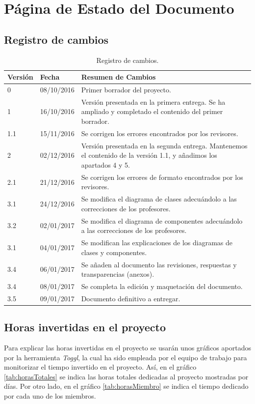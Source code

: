 \section*{Página de Estado del Documento}

\subsection*{Registro de cambios}
\begin{table}[htbp]
\begin{center}
\begin{tabular}{l l p{11cm} }
\textbf{Versión}&\textbf{Fecha}&\textbf{Resumen de Cambios}\\
\hline \hline
0&08/10/2016&Primer borrador del proyecto.\\
\hline
1&16/10/2016&Versión presentada en la primera entrega. Se ha ampliado y completado el contenido del primer
borrador.\\
\hline
1.1&15/11/2016&Se corrigen los errores encontrados por los revisores.\\
\hline
2&02/12/2016&Versión presentada en la segunda entrega. Mantenemos el contenido de la versión 1.1, y
añadimos los apartados 4 y 5.\\
\hline
2.1&21/12/2016&Se corrigen los errores de formato encontrados por los revisores.\\
\hline
3.1&24/12/2016&Se modifica el diagrama de clases\index{clase} adecuándolo a las correcciones de los profesores.\\
\hline
3.2&02/01/2017&Se modifica el diagrama de componentes\index{componente} adecuándolo a las correcciones de los profesores.\\
\hline
3.1&04/01/2017&Se modifican las explicaciones de los diagramas de clases\index{clase} y componentes\index{componente}.\\
\hline
3.4&06/01/2017&Se añaden al documento las revisiones, respuestas y transparencias (anexos).\\
\hline
3.4&08/01/2017&Se completa la edición y maquetación del documento.\\
\hline
3.5&09/01/2017&Documento definitivo a entregar.\\
\hline
\end{tabular}
\caption{Registro de cambios.}
\label{tabla:changeReg}
\end{center}
\end{table}

\subsection*{Horas invertidas en el proyecto}
\par Para explicar las horas invertidas en el proyecto se usarán unos gráficos aportados por la herramienta \textit{Toggl}, la cual ha sido empleada por el equipo de trabajo para monitorizar el tiempo invertido en el proyecto. Así, en el gráfico \ref{tab:horasTotales} se indica las horas totales dedicadas al proyecto mostradas por días. Por otro lado, en el gráfico \ref{tab:horasMiembro} se indica el tiempo dedicado por cada uno de los miembros.

